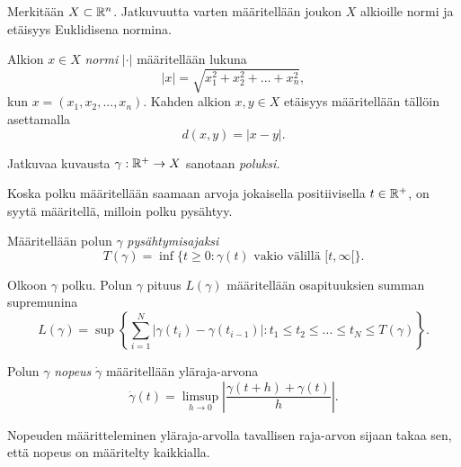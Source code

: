 \documentclass[12pt,oneside,a4paper]{amsbook} %
\begin{document}
Merkitään $X \subset \mathbb{R}^n$. Jatkuvuutta varten määritellään joukon $X$ alkioille normi ja etäisyys Euklidisena normina.
\begin{definition}
    Alkion $x \in X$ \textit{normi} $|\cdot|$ määritellään lukuna
    \begin{equation*}
        |x| = \sqrt{x_1^2 + x_2^2 + ... + x_n^2},
    \end{equation*}
    kun $x = (x_1, x_2, ... , x_n)$. Kahden alkion $x, y \in X$ etäisyys määritellään tällöin asettamalla
    \begin{equation*}
        d(x, y) = |x - y|.
    \end{equation*}
\end{definition}

\begin{definition}
    Jatkuvaa kuvausta $\gamma:{\mathbb{R}^{+}} \to X$ sanotaan \textit{poluksi.}
\end{definition}

Koska polku määritellään saamaan arvoja jokaisella positiivisella $t \in {\mathbb{R}^{+}}$, on syytä määritellä, milloin polku pysähtyy.

\begin{definition}
    Määritellään polun $\gamma$ \textit{pysähtymisajaksi} 
    \begin{equation*}
        T(\gamma) = \inf\{t\ge0:\gamma(t) \text{ vakio välillä } [t,\infty[ \}.
    \end{equation*}
\end{definition}

\begin{definition}
    Olkoon $\gamma$ polku. Polun $\gamma$ pituus $L(\gamma)$ määritellään osapituuksien summan supremunina
    \begin{equation*}
        L(\gamma) = \sup\left\{\sum_{i=1}^N|\gamma(t_i) - \gamma(t_{i-1})| : t_1 \le t_2 \le ... \le t_N \le T(\gamma)\right\}.
    \end{equation*}
\end{definition}

\begin{definition}
    Polun $\gamma$ \textit{nopeus} $\dot \gamma$ määritellään yläraja-arvona
    \begin{equation*}
        \dot\gamma(t) = \limsup_{h\to 0} \left|\frac{\gamma(t+h) + \gamma(t)}{h}\right|.
    \end{equation*}
\end{definition}

Nopeuden määritteleminen yläraja-arvolla tavallisen raja-arvon sijaan takaa sen, että nopeus on määritelty kaikkialla.
\end{document}
